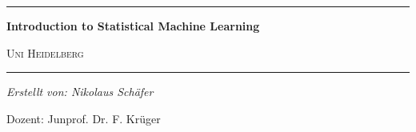 \documentclass[11pt,a4paper,numbers=endperiod]{scrartcl}
\def\Namen{} %
\def\Datum{} %
\begin{document}
	\Namen \hfill \Datum\par
	\vspace{0.25\baselineskip}
	\hrule
	\vspace{\baselineskip}
	\begin{center}
		{\LARGE\textbf{Introduction to Statistical Machine Learning}}\par
		\vspace{0.25\baselineskip}
		{\large\textsc{Uni Heidelberg}}
	\end{center}
	\hrule 
	
	\vspace{\baselineskip}
	\vspace{\baselineskip}
	\vspace{\baselineskip}
	\vspace{\baselineskip}
	\vspace{\baselineskip}
	\vspace{\baselineskip}
	\vspace{\baselineskip}
	\vspace{\baselineskip}
	\vspace{\baselineskip}
	\vspace{\baselineskip}
	
	
	
	
	\begin{center}
		{\large\itshape Erstellt von: Nikolaus Schäfer}
	\end{center}
	
	\vspace{\baselineskip}
	\vspace{\baselineskip}
	\vspace{\baselineskip}
	\vspace{\baselineskip}
	\vspace{\baselineskip}
	\vspace{\baselineskip}
	\vspace{\baselineskip}
	\vspace{\baselineskip}
	\vspace{\baselineskip}
	\vspace{\baselineskip}
	
	\begin{center}
		{\large Dozent: Junprof. Dr. F. Krüger}
	\end{center}
	\vspace{\baselineskip}
	\vspace{\baselineskip}
	\vspace{\baselineskip}
	\vspace{\baselineskip}
	\vspace{\baselineskip}
	\vspace{\baselineskip}
	\vspace{\baselineskip}
	\vspace{\baselineskip}
	\vspace{\baselineskip}
	\vspace{\baselineskip}
	
\end{document}
